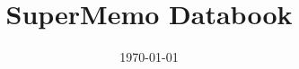 \documentclass{article}
\begin{document}
\title{SuperMemo Databook}
\date{\today}
\maketitle


\end{document}
